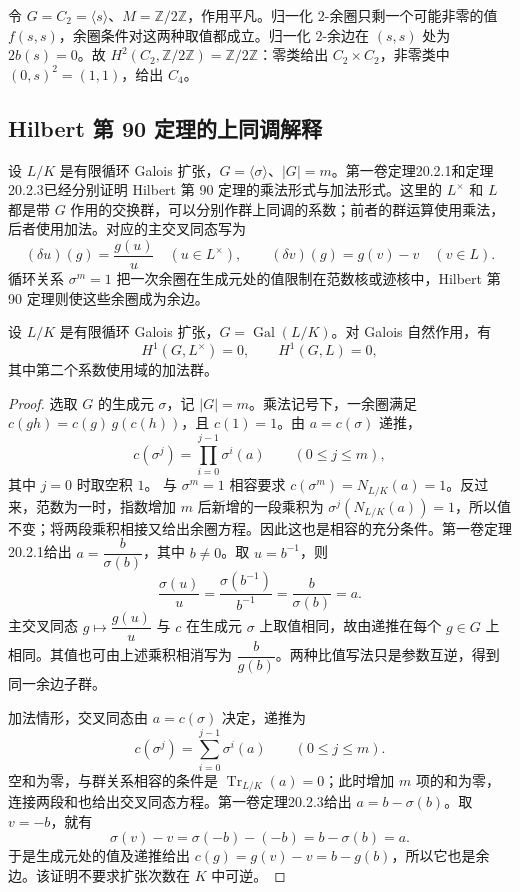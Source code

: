 \begin{example}\label{b4:exm:cyclic-two-extension}
	令 \(G=C_2=\langle s\rangle\)、\(M=\mathbb Z/2\mathbb Z\)，作用平凡。归一化 \(2\)-余圈只剩一个可能非零的值 \(f(s,s)\)，余圈条件对这两种取值都成立。归一化 \(2\)-余边在 \((s,s)\) 处为 \(2b(s)=0\)。故 \(H^2(C_2,\mathbb Z/2\mathbb Z)=\mathbb Z/2\mathbb Z\)：零类给出 \(C_2\times C_2\)，非零类中 \((0,s)^2=(1,1)\)，给出 \(C_4\)。
\end{example}

\subsection{Hilbert 第 90 定理的上同调解释}
\label{b4:subsec:1102:03}

设 \(L/K\) 是有限循环 Galois 扩张，\(G=\langle\sigma\rangle\)、\(|G|=m\)。第一卷定理20.2.1和定理20.2.3已经分别证明 Hilbert 第 90 定理的乘法形式与加法形式。这里的 \(L^\times\) 和 \(L\) 都是带 \(G\) 作用的交换群，可以分别作群上同调的系数；前者的群运算使用乘法，后者使用加法。对应的主交叉同态写为
\[
	(\delta u)(g)=\frac{g(u)}{u}\quad(u\in L^\times), \qquad (\delta v)(g)=g(v)-v\quad(v\in L).
\]
循环关系 \(\sigma^m=1\) 把一次余圈在生成元处的值限制在范数核或迹核中，Hilbert 第 90 定理则使这些余圈成为余边。

\begin{proposition}\label{b4:prop:hilbert90-cohomology}
	设 \(L/K\) 是有限循环 Galois 扩张，\(G=\operatorname{Gal}(L/K)\)。对 Galois 自然作用，有
	\[
		H^1(G,L^\times)=0,\qquad H^1(G,L)=0,
	\]
	其中第二个系数使用域的加法群。
\end{proposition}
\begin{proof}
	选取 \(G\) 的生成元 \(\sigma\)，记 \(|G|=m\)。乘法记号下，一余圈满足 \(c(gh)=c(g)\,g(c(h))\)，且 \(c(1)=1\)。由 \(a=c(\sigma)\) 递推，
	\[
		c(\sigma^j)=\prod_{i=0}^{j-1}\sigma^i(a)\qquad(0\le j\le m),
	\]
	其中 \(j=0\) 时取空积 \(1\)。
	与 \(\sigma^m=1\) 相容要求 \(c(\sigma^m)=N_{L/K}(a)=1\)。反过来，范数为一时，指数增加 \(m\) 后新增的一段乘积为 \(\sigma^j(N_{L/K}(a))=1\)，所以值不变；将两段乘积相接又给出余圈方程。因此这也是相容的充分条件。第一卷定理20.2.1给出 \(a=\dfrac{b}{\sigma(b)}\)，其中 \(b\ne0\)。取 \(u=b^{-1}\)，则
	\[
		\frac{\sigma(u)}{u} =\frac{\sigma(b^{-1})}{b^{-1}} =\frac{b}{\sigma(b)}=a.
	\]
	主交叉同态 \(g\mapsto\dfrac{g(u)}{u}\) 与 \(c\) 在生成元 \(\sigma\) 上取值相同，故由递推在每个 \(g\in G\) 上相同。其值也可由上述乘积相消写为 \(\dfrac{b}{g(b)}\)。两种比值写法只是参数互逆，得到同一余边子群。

	加法情形，交叉同态由 \(a=c(\sigma)\) 决定，递推为
	\[
		c(\sigma^j)=\sum_{i=0}^{j-1}\sigma^i(a)\qquad(0\le j\le m).
	\]
	空和为零，与群关系相容的条件是 \(\operatorname{Tr}_{L/K}(a)=0\)；此时增加 \(m\) 项的和为零，连接两段和也给出交叉同态方程。第一卷定理20.2.3给出 \(a=b-\sigma(b)\)。取 \(v=-b\)，就有
	\[
		\sigma(v)-v=\sigma(-b)-(-b)=b-\sigma(b)=a.
	\]
	于是生成元处的值及递推给出 \(c(g)=g(v)-v=b-g(b)\)，所以它也是余边。该证明不要求扩张次数在 \(K\) 中可逆。
\end{proof}

